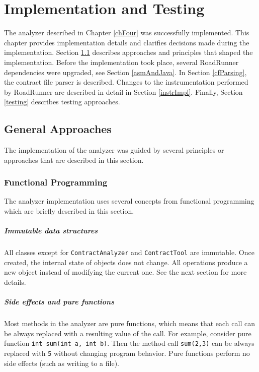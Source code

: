 \chapter{Implementation and Testing}
\label{chFive}

The analyzer described in Chapter \ref{chFour} was successfully implemented.
This chapter provides implementation details and clarifies decisions made during
the implementation. Section \ref{approaches} describes approaches and principles
that shaped the implementation. Before the implementation took place, several
RoadRunner dependencies were upgraded, see Section \ref{asmAndJava}. In Section
\ref{cfParsing}, the contract file parser is described. Changes to the
instrumentation performed by RoadRunner are described in detail in Section
\ref{instrImpl}. Finally, Section \ref{testing} describes testing approaches.

\section{General Approaches}
\label{approaches}
The implementation of the analyzer was guided by several principles or
approaches that are described in this section.

\subsection{Functional Programming}
The analyzer implementation uses several concepts from functional programming
which are briefly described in this section.

\paragraph{Immutable data structures}
All classes except for \texttt{ContractAnalyzer} and \texttt{ContractTool} are
immutable. Once created, the internal state of objects does not change. All
operations produce a new object instead of modifying the current one. See the
next section for more details.

\paragraph{Side effects and pure functions}
Most methods in the analyzer are pure functions, which means that each call can
be always replaced with a resulting value of the call. For example, consider
pure function \texttt{int sum(int a, int b)}. Then the method call
\texttt{sum(2,3)} can be always replaced with \texttt{5} without changing
program behavior. Pure functions perform no side effects (such as writing to a
file).

